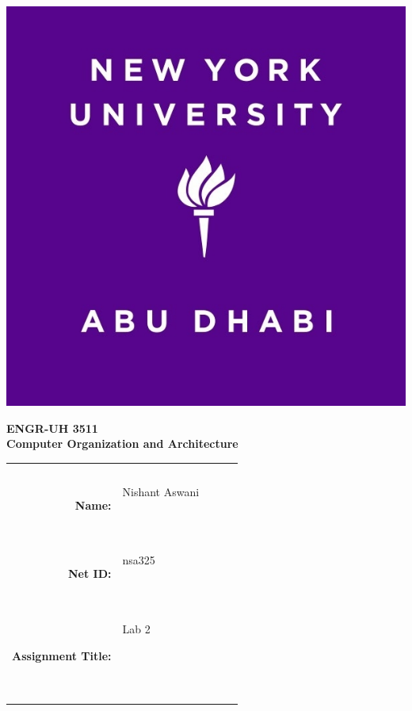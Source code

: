 \documentclass[twocolumn]{article}
\title{\myassignmenttitle}
\author{\myname, \myemail}
\affil{\myclassname (\mycoursenumber), Instructor \myinstructor}
\date{}
\newcommand{\myname}{Nishant Aswani}
\newcommand{\mynetid}{nsa325}
\newcommand{\myhwtype}{Lab }
\newcommand{\myhwnum}{2}
\newcommand{\mycoursenumber}{ENGR-UH 3511}
\newcommand{\myclassname}{Computer Organization and Architecture}
\begin{document}
\onecolumn
\pagestyle{fancy}
\fancyhf{}
\renewcommand{\headrulewidth}{0pt}

\begin{center}
  \includegraphics[scale=0.15]{etc/NYUAD-alt-logo.jpg}
\end{center}

{\vspace{2.5em}}

\begin{center}
    \Huge{\textbf{\mycoursenumber}}\\
    {\vspace{0.5em}}
    \Huge{\textbf{\myclassname}}
\end{center}

{\vspace{10em}}

\begin{center}
  \begin{tabular}{|rp{5.0cm}lll|}
    \hline
    &  &  &  & \\
    &  &  &  & \\
    \Large{\textbf{Name:}} & \Large{\myname}
    
    \  &  &  & \\
    \Large{\textbf{Net ID:}} & \Large{\mynetid}
    
    \  &  &  & \\
    \Large{\textbf{Assignment Title:}} & \Large{\myhwtype \myhwnum}
    
    \
    
    \  &  &  & \\
    \hline
  \end{tabular}
\end{center}
\end{document}
